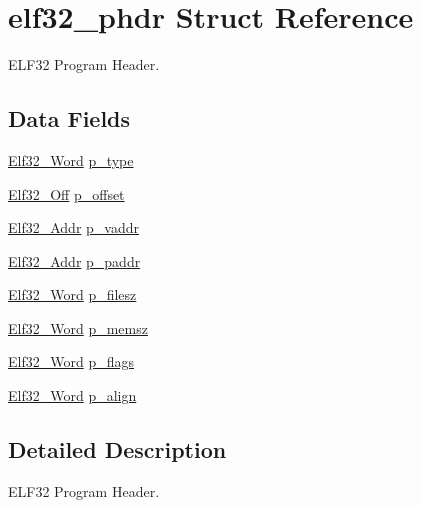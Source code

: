\hypertarget{structelf32__phdr}{\section{elf32\+\_\+phdr Struct Reference}
\label{structelf32__phdr}
}


E\+L\+F32 Program Header.  


\subsection*{Data Fields}
\begin{DoxyCompactItemize}
\item 
\hyperlink{exec_8c_af5924ece606c732e86f8263a19408e45}{Elf32\+\_\+\+Word} \hyperlink{structelf32__phdr_ac875c2371d8cf5e6e2084050ae6ccf73}{p\+\_\+type}
\item 
\hyperlink{exec_8c_a655751f9b317369b93c581ea8ed84516}{Elf32\+\_\+\+Off} \hyperlink{structelf32__phdr_af88bab5054a39a619ff2f8a5424c3316}{p\+\_\+offset}
\item 
\hyperlink{exec_8c_a40c6d4571e6001f443cc6a6474620158}{Elf32\+\_\+\+Addr} \hyperlink{structelf32__phdr_a4ce34fb0d117afd27046b923756faa11}{p\+\_\+vaddr}
\item 
\hyperlink{exec_8c_a40c6d4571e6001f443cc6a6474620158}{Elf32\+\_\+\+Addr} \hyperlink{structelf32__phdr_a7a76a0d640bab3bfdbf48ffd14d40fe9}{p\+\_\+paddr}
\item 
\hyperlink{exec_8c_af5924ece606c732e86f8263a19408e45}{Elf32\+\_\+\+Word} \hyperlink{structelf32__phdr_a4b9173c35966a1ad03681a72ceabe291}{p\+\_\+filesz}
\item 
\hyperlink{exec_8c_af5924ece606c732e86f8263a19408e45}{Elf32\+\_\+\+Word} \hyperlink{structelf32__phdr_af44d75db8b3ebcfa04742e55b49e7eb6}{p\+\_\+memsz}
\item 
\hyperlink{exec_8c_af5924ece606c732e86f8263a19408e45}{Elf32\+\_\+\+Word} \hyperlink{structelf32__phdr_a988c9108c42fa294891b5f94d60cb06e}{p\+\_\+flags}
\item 
\hyperlink{exec_8c_af5924ece606c732e86f8263a19408e45}{Elf32\+\_\+\+Word} \hyperlink{structelf32__phdr_a36b59708697a8e025409ec1a2614acdf}{p\+\_\+align}
\end{DoxyCompactItemize}


\subsection{Detailed Description}
E\+L\+F32 Program Header. 

